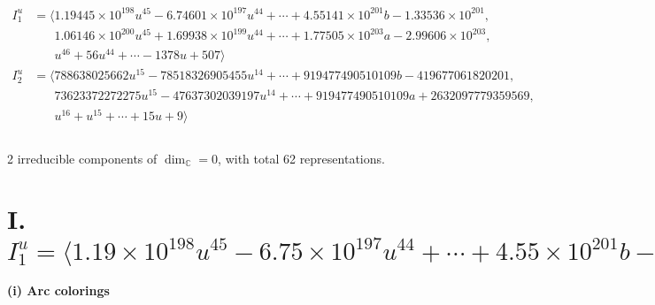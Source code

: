 \documentclass[1p]{elsarticle_modified}
\theoremstyle{definition}
\begin{document}
\begin{align*}
I^u_{1}&=\langle 
1.19445\times10^{198} u^{45}-6.74601\times10^{197} u^{44}+\cdots+4.55141\times10^{201} b-1.33536\times10^{201},\\
\phantom{I^u_{1}}&\phantom{= \langle  }1.06146\times10^{200} u^{45}+1.69938\times10^{199} u^{44}+\cdots+1.77505\times10^{203} a-2.99606\times10^{203},\\
\phantom{I^u_{1}}&\phantom{= \langle  }u^{46}+56 u^{44}+\cdots-1378 u+507\rangle \\
I^u_{2}&=\langle 
788638025662 u^{15}-78518326905455 u^{14}+\cdots+919477490510109 b-419677061820201,\\
\phantom{I^u_{2}}&\phantom{= \langle  }73623372272275 u^{15}-47637302039197 u^{14}+\cdots+919477490510109 a+2632097779359569,\\
\phantom{I^u_{2}}&\phantom{= \langle  }u^{16}+u^{15}+\cdots+15 u+9\rangle \\
\\
\end{align*}
\raggedright * 2 irreducible components of $\dim_{\mathbb{C}}=0$, with total 62 representations.\\
\newpage
\renewcommand{\arraystretch}{1}
\centering \section*{I. $I^u_{1}= \langle 1.19\times10^{198} u^{45}-6.75\times10^{197} u^{44}+\cdots+4.55\times10^{201} b-1.34\times10^{201},\;1.06\times10^{200} u^{45}+1.70\times10^{199} u^{44}+\cdots+1.78\times10^{203} a-3.00\times10^{203},\;u^{46}+56 u^{44}+\cdots-1378 u+507 \rangle$}
\flushleft \textbf{(i) Arc colorings}\\
\end{document}
